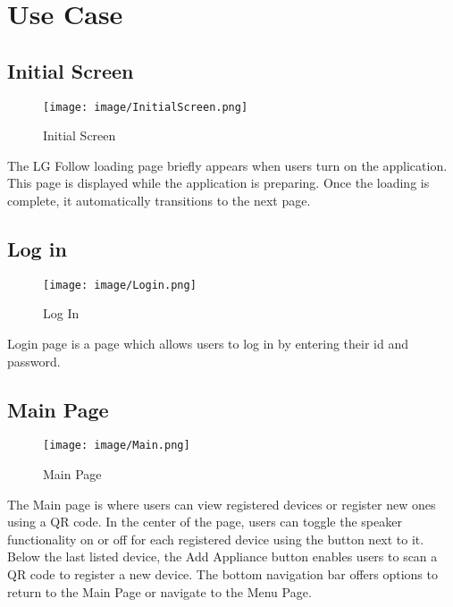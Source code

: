 \documentclass[conference]{IEEEtran}
\begin{document}
\section{Use Case}

\subsection{Initial Screen}
\begin{figure}[h!]
    \centering
    \texttt{[image: image/InitialScreen.png]}
    \caption{Initial Screen}
    \label{fig:enter-label}
\end{figure}

\noindent The LG Follow loading page briefly appears when users turn on the application. This page is displayed while the application is preparing. Once the loading is complete, it automatically transitions to the next page.\\


\subsection{Log in}
\begin{figure}[h!]
    \centering
    \texttt{[image: image/Login.png]}
    \caption{Log In}
    \label{fig:enter-label}
\end{figure}

\noindent Login page is a page which allows users to log in by entering their id and password.\\



\subsection{Main Page}

\begin{figure}[h!]
    \centering
    \texttt{[image: image/Main.png]}
    \caption{Main Page}
    \label{fig:enter-label}
\end{figure}

\noindent The Main page is where users can view registered devices or register new ones using a QR code. In the center of the page, users can toggle the speaker functionality on or off for each registered device using the button next to it. Below the last listed device, the Add Appliance button enables users to scan a QR code to register a new device. The bottom navigation bar offers options to return to the Main Page or navigate to the Menu Page.\\
\end{document}
